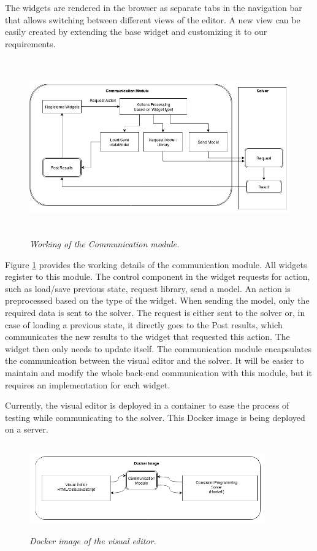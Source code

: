 \documentclass[a4paper]{article}
\begin{document}
The widgets are rendered in the browser as separate tabs in the navigation bar that allows switching between different views of the editor. A new view can be easily created by extending the base widget and customizing it to our requirements.

\begin{figure}
\begin{center}
\includegraphics[height=3in,width=5in]{img/communication.png}
\caption{\small \sl Working of the Communication module.\label{fig:communication}}
\end{center}
\end{figure}

Figure \ref{fig:communication} provides the working details of the communication module. All widgets register to this module. The control component in the widget requests for action, such as load/save previous state, request library, send a model. An action is preprocessed based on the type of the widget. When sending the model, only the required data is sent to the solver. The request is either sent to the solver or, in case of loading a previous state, it directly goes to the Post results, which communicates the new results to the widget that requested this action. The widget then only needs to update itself. The communication module encapsulates the communication between the visual editor and the solver. It will be easier to maintain and modify the whole back-end communication with this module, but it requires an implementation for each widget.

Currently, the visual editor is deployed in a container to ease the process of testing while communicating to the solver. This Docker image is being deployed on a server.

\begin{figure}
\begin{center}
\includegraphics[height=1.5in,width=4in]{img/e2e.png}
\caption{\small \sl Docker image of the visual editor.\label{fig:e2e}}
\end{center}
\end{figure}
\end{document}
